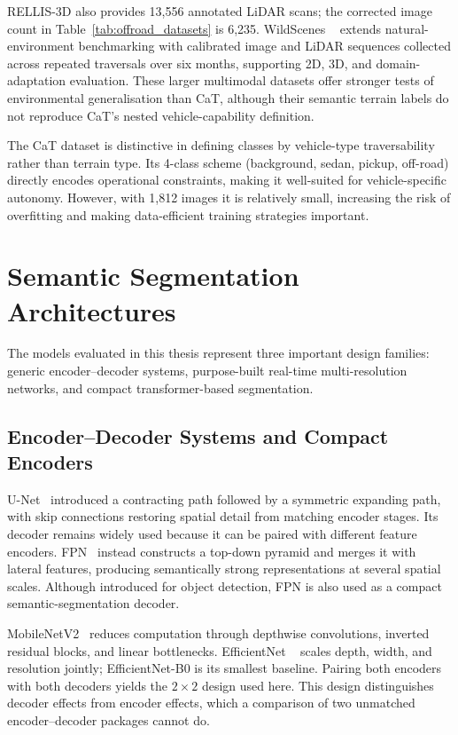 \documentclass[12pt,a4paper]{report}
\begin{document}
RELLIS-3D also provides 13{,}556 annotated LiDAR scans; the corrected image
count in Table~\ref{tab:offroad_datasets} is 6{,}235. WildScenes
~\cite{vidanapathirana2025wildscenes} extends natural-environment benchmarking
with calibrated image and LiDAR sequences collected across repeated traversals
over six months, supporting 2D, 3D, and domain-adaptation evaluation. These
larger multimodal datasets offer stronger tests of environmental generalisation
than CaT, although their semantic terrain labels do not reproduce CaT's nested
vehicle-capability definition.

The CaT dataset is distinctive in defining classes by vehicle-type traversability rather than terrain type.
Its 4-class scheme (background, sedan, pickup, off-road) directly encodes operational constraints, making it well-suited for vehicle-specific autonomy.
However, with 1{,}812 images it is relatively small, increasing the risk of overfitting and making data-efficient training strategies important.

\section{Semantic Segmentation Architectures}

The models evaluated in this thesis represent three important design families:
generic encoder--decoder systems, purpose-built real-time multi-resolution
networks, and compact transformer-based segmentation.

\subsection{Encoder--Decoder Systems and Compact Encoders}

U-Net~\cite{ronneberger2015unet} introduced a contracting path followed by a
symmetric expanding path, with skip connections restoring spatial detail from
matching encoder stages. Its decoder remains widely used because it can be
paired with different feature encoders. FPN~\cite{lin2017fpn} instead constructs
a top-down pyramid and merges it with lateral features, producing semantically
strong representations at several spatial scales. Although introduced for
object detection, FPN is also used as a compact semantic-segmentation decoder.

MobileNetV2~\cite{sandler2018mobilenetv2} reduces computation through depthwise
convolutions, inverted residual blocks, and linear bottlenecks. EfficientNet
~\cite{tan2019efficientnet} scales depth, width, and resolution jointly;
EfficientNet-B0 is its smallest baseline. Pairing both encoders with both
decoders yields the $2\times2$ design used here. This design distinguishes
decoder effects from encoder effects, which a comparison of two unmatched
encoder--decoder packages cannot do.
\end{document}
